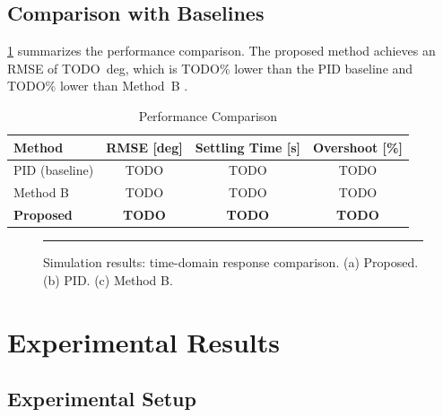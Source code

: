 \documentclass[journal]{IEEEtran}
\begin{document}
\subsection{Comparison with Baselines}

\cref{tab:comparison} summarizes the performance comparison.
The proposed method achieves an RMSE of TODO~deg,
which is TODO\% lower than the PID baseline and TODO\% lower than Method~B \cite{TODO_ref}.

\begin{table}[htbp]
  \caption{Performance Comparison}
  \label{tab:comparison}
  \centering
  \begin{tabular}{lccc}
    \toprule
    Method & RMSE [deg] & Settling Time [s] & Overshoot [\%] \\
    \midrule
    PID (baseline)    & TODO & TODO & TODO \\
    Method B \cite{TODO_ref} & TODO & TODO & TODO \\
    \textbf{Proposed} & \textbf{TODO} & \textbf{TODO} & \textbf{TODO} \\
    \bottomrule
  \end{tabular}
\end{table}

\begin{figure}[htbp]
  \centering
  \rule{\columnwidth}{0.4pt}
  \vspace{1em}
  \caption{Simulation results: time-domain response comparison.
           (a) Proposed. (b) PID. (c) Method B.}
  \label{fig:sim_response}
\end{figure}


\section{Experimental Results}
\label{sec:experiment}

\subsection{Experimental Setup}
\end{document}
